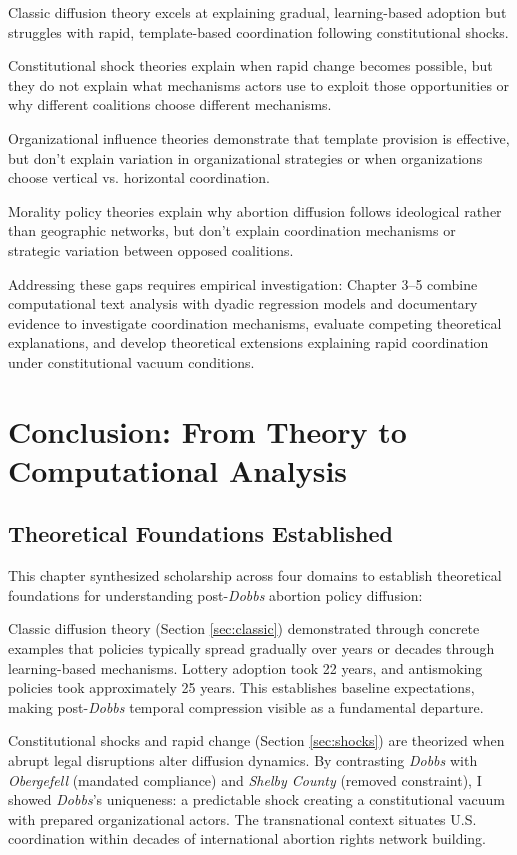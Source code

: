 Classic diffusion theory excels at explaining gradual, learning-based adoption but struggles with rapid, template-based coordination following constitutional shocks.

Constitutional shock theories explain when rapid change becomes possible, but they do not explain what mechanisms actors use to exploit those opportunities or why different coalitions choose different mechanisms.

Organizational influence theories demonstrate that template provision is effective, but don't explain variation in organizational strategies or when organizations choose vertical vs. horizontal coordination.

Morality policy theories explain why abortion diffusion follows ideological rather than geographic networks, but don't explain coordination mechanisms or strategic variation between opposed coalitions.

Addressing these gaps requires empirical investigation: Chapter 3--5 combine computational text analysis with dyadic regression models and documentary evidence to investigate coordination mechanisms, evaluate competing theoretical explanations, and develop theoretical extensions explaining rapid coordination under constitutional vacuum conditions.

\section{Conclusion: From Theory to Computational Analysis}
\label{sec:conclusion}

\subsection{Theoretical Foundations Established}

This chapter synthesized scholarship across four domains to establish theoretical foundations for understanding post-\emph{Dobbs} abortion policy diffusion:

Classic diffusion theory (Section \ref{sec:classic}) demonstrated through concrete examples that policies typically spread gradually over years or decades through learning-based mechanisms. Lottery adoption took 22 years, and antismoking policies took approximately 25 years. This establishes baseline expectations, making post-\textit{Dobbs} temporal compression visible as a fundamental departure.

Constitutional shocks and rapid change (Section \ref{sec:shocks}) are theorized when abrupt legal disruptions alter diffusion dynamics. By contrasting \textit{Dobbs} with \textit{Obergefell} (mandated compliance) and \textit{Shelby County} (removed constraint), I showed \textit{Dobbs}'s uniqueness: a predictable shock creating a constitutional vacuum with prepared organizational actors. The transnational context situates U.S. coordination within decades of international abortion rights network building.

